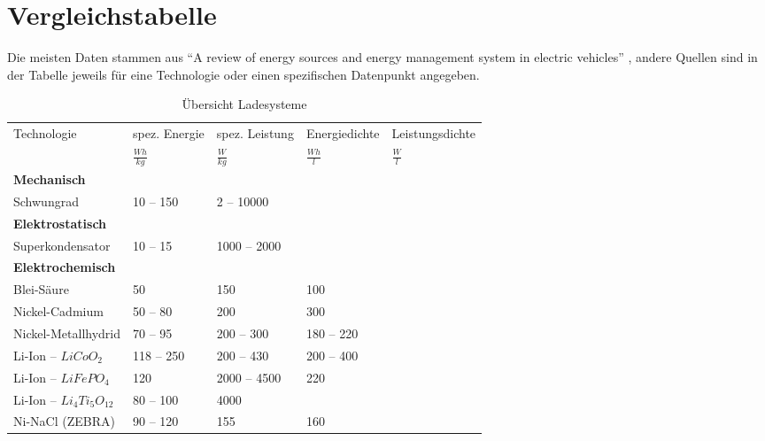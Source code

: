 \section{Vergleichstabelle}   %
Die meisten Daten stammen aus "`A review of energy sources and energy management system in electric vehicles"' \cite{Tie201382}, andere Quellen sind in der Tabelle jeweils für eine Technologie oder einen spezifischen Datenpunkt angegeben.
\begin{table}\centering
	\begin{tabularx}{\linewidth}{lXXXX}
		\toprule
		\multirow{2}{*}{Technologie} & spez. Energie   & spez. Leistung & Energiedichte  & Leistungsdichte \\
		                             & $\frac{Wh}{kg}$ & $\frac{W}{kg}$ & $\frac{Wh}{l}$ & $\frac{W}{l}$   \\ \midrule
		\textbf{Mechanisch}          &                 &                &                &  \\
		Schwungrad                   & 10 -- 150       & 2 -- 10000     &                &  \\
		\textbf{Elektrostatisch}     &                 &                &                &  \\
		Superkondensator             & 10 -- 15        & 1000 -- 2000   &                &  \\
		\textbf{Elektrochemisch}     &                 &                &                &  \\
		Blei-Säure                   & 50              & 150            & 100            &  \\
		Nickel-Cadmium               & 50 -- 80        & 200            & 300            &  \\
		Nickel-Metallhydrid          & 70 -- 95        & 200 -- 300     & 180 -- 220     &  \\
		Li-Ion -- $LiCoO_2$          & 118 -- 250      & 200 -- 430     & 200 -- 400     &  \\
		Li-Ion -- $LiFePO_4$         & 120             & 2000 -- 4500   & 220            &  \\
		Li-Ion -- $Li_4Ti_5O_{12}$   & 80 -- 100       & 4000           &                &  \\
		Ni-NaCl (ZEBRA)              & 90 -- 120       & 155            & 160            &  \\ \bottomrule
	\end{tabularx}
	\caption{Übersicht Ladesysteme}
	\label{vergleichstabelle_speichertechnologien}
\end{table}